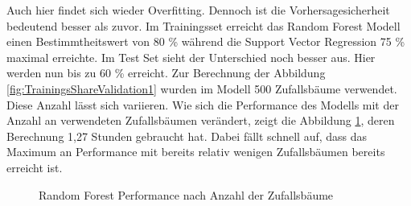\documentclass[a4paper,12pt]{thesis}
\begin{document}
Auch hier findet sich wieder Overfitting. Dennoch ist die Vorhersagesicherheit bedeutend besser als zuvor. Im Trainingsset erreicht das Random Forest Modell einen Bestimmtheitswert von 80 \% während die Support Vector Regression 75 \% maximal erreichte. Im Test Set sieht der Unterschied noch besser aus. Hier werden nun bis zu 60 \% erreicht. Zur Berechnung der Abbildung \ref{fig:TrainingsShareValidation1} wurden im Modell 500 Zufallsbäume verwendet. Diese Anzahl lässt sich variieren. Wie sich die Performance des Modells mit der Anzahl an verwendeten Zufallsbäumen verändert, zeigt die Abbildung \ref{fig:NTreeValidation1}, deren Berechnung 1,27 Stunden gebraucht hat. Dabei fällt schnell auf, dass das Maximum an Performance mit bereits relativ wenigen Zufallsbäumen bereits erreicht ist.

\begin{figure}%
	\centering
	\qquad
	\caption{Random Forest Performance nach Anzahl der Zufallsbäume}%
	\label{fig:NTreeValidation1}%
\end{figure}
\end{document}
